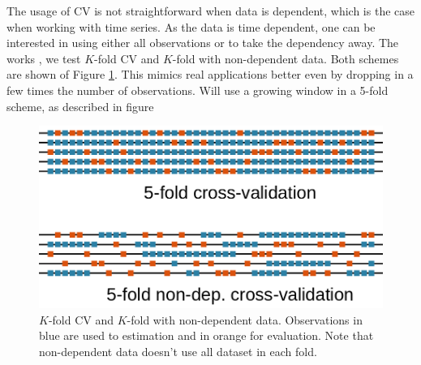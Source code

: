 The usage of CV is not straightforward when data is dependent, which is the case when working with time series. As the data is time dependent, one can be interested in using either all observations or to take the dependency away. The works
\cite{bergmeir_note_2017,bergmeir_use_2012}, we test $K$-fold CV and $K$-fold with non-dependent data. Both schemes are shown of Figure \ref{fig:cross-validation-scheme}.
 This mimics real applications better even by dropping in a few times the number of observations. Will use a growing window in a 5-fold scheme, as described in figure 
\begin{figure}
\centering
\includegraphics[width=0.9\linewidth]{../Figuras/Cross-validation-scheme}
\caption{$K$-fold CV and $K$-fold with non-dependent data. Observations in blue are used to estimation and in orange for evaluation. Note that non-dependent data doesn't use all dataset in each fold.}
\label{fig:cross-validation-scheme}
\end{figure}

